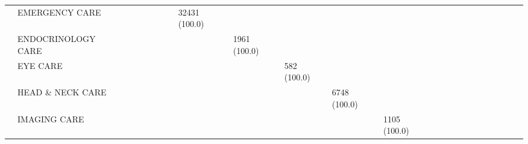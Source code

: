 \begin{tabular}{llllllllllllllllllllllll}
                                       & EMERGENCY CARE &                             &                   &                    &                   &                      &                        &       32431 (100.0) &                     &                     &                     &                    &                             &                   &                      &                                  &                    &                    &                    &                   &                       &                     &                    \\
                                       & ENDOCRINOLOGY CARE &                             &                   &                    &                   &                      &                        &                     &        1961 (100.0) &                     &                     &                    &                             &                   &                      &                                  &                    &                    &                    &                   &                       &                     &                    \\
                                       & EYE CARE &                             &                   &                    &                   &                      &                        &                     &                     &         582 (100.0) &                     &                    &                             &                   &                      &                                  &                    &                    &                    &                   &                       &                     &                    \\
                                       & HEAD \& NECK CARE &                             &                   &                    &                   &                      &                        &                     &                     &                     &        6748 (100.0) &                    &                             &                   &                      &                                  &                    &                    &                    &                   &                       &                     &                    \\
                                       & IMAGING CARE &                             &                   &                    &                   &                      &                        &                     &                     &                     &                     &       1105 (100.0) &                             &                   &                      &                                  &                    &                    &                    &                   &                       &                     &                    \\

\end{tabular}
